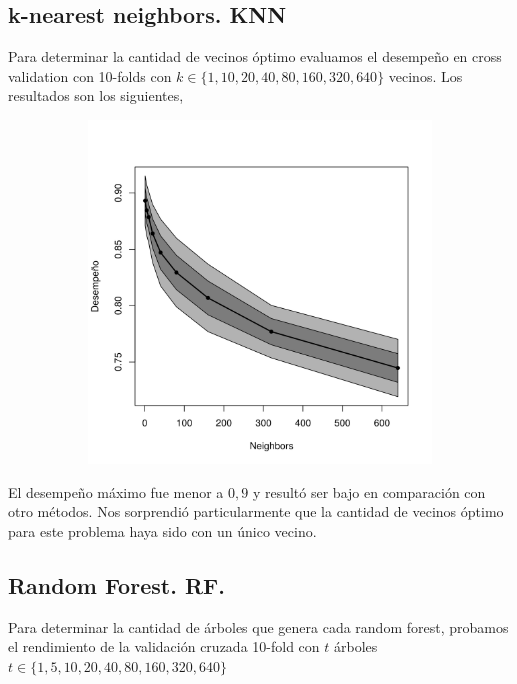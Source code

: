 \documentclass[a4paper,10pt]{article}
\begin{document}
\subsection{k-nearest neighbors. KNN}

Para determinar la cantidad de vecinos \'optimo evaluamos el desempeño en cross validation con 10-folds con $k \in \{1,10,20,40,80,160,320,640\} $ vecinos. Los resultados son los siguientes, 

\begin{figure}[H]
  \centering
  \begin{subfigure}[b]{0.4\textwidth}
    \includegraphics[width=\textwidth]{../imagenes/knn-n_neighbors}
  \end{subfigure}
  \caption{}
  \label{fig:knn-n_neighbors}
\end{figure}

El desempeño m\'aximo fue menor a $0,9$ y result\'o ser bajo en comparaci\'on con otro m\'etodos. Nos sorprendi\'o particularmente que la cantidad de vecinos \'optimo para este problema haya sido con un \'unico vecino. 

\subsection{Random Forest. RF.}

Para determinar la cantidad de \'arboles que genera cada random forest, probamos el rendimiento de la validaci\'on cruzada 10-fold con $t$ \'arboles $t \in \{1,5,10,20,40,80,160,320,640\}$
\end{document}
